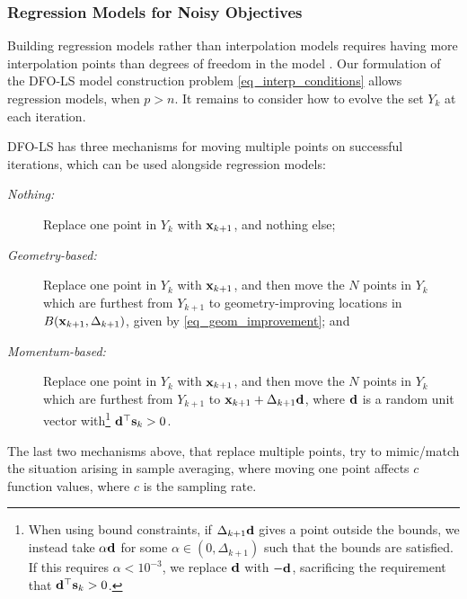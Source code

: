 \subsubsection{Regression Models for Noisy Objectives}

Building regression models rather than interpolation models requires having more interpolation points than degrees of freedom in the model \cite{Conn2008,Billups2013,Chen2016}. 
Our formulation of the DFO-LS model construction problem \eqref{eq_interp_conditions} allows regression models, 
when $p>n$. It remains to consider 
how to evolve the set $Y_k$ at each iteration.


DFO-LS has three mechanisms for moving multiple points on successful iterations, which can be used alongside regression models:
\begin{description}
	\item[\normalfont\textit{Nothing:}] Replace one point in $Y_k$ with $\mathbf{x}_{k+1}$, and nothing else;
	\item[\normalfont\textit{Geometry-based:}] Replace one point in $Y_k$ with $\mathbf{x}_{k+1}$, and then move the $N$ points in $Y_k$ which are furthest from $Y_{k+1}$ to geometry-improving locations in $B(\mathbf{x}_{k+1},\Delta_{k+1})$, given by \eqref{eq_geom_improvement}; and
	\item[\normalfont\textit{Momentum-based:}] Replace one point in $Y_k$ with $\mathbf{x}_{k+1}$, and then move the $N$ points in $Y_k$ which are furthest from $Y_{k+1}$ to $\mathbf{x}_{k+1}+\Delta_{k+1}\mathbf{d}$, where $\mathbf{d}$ is a random unit vector with\footnote{\:When using bound constraints, if $\Delta_{k+1}\mathbf{d}$ gives a point outside the bounds, we instead take $\alpha\mathbf{d}$ for some $\alpha\in(0,\Delta_{k+1})$ such that the bounds are satisfied. If this requires $\alpha<10^{-3}$, we replace $\mathbf{d}$ with $-\mathbf{d}$, sacrificing the requirement that $\mathbf{d}^{\top}\mathbf{s}_k>0$.} $\mathbf{d}^{\top}\mathbf{s}_k>0$.
\end{description}
The last two mechanisms above, that replace multiple points,
 try to mimic/match the situation arising in sample averaging, where moving one point affects $c$ function values, where $c$ is the sampling rate.

